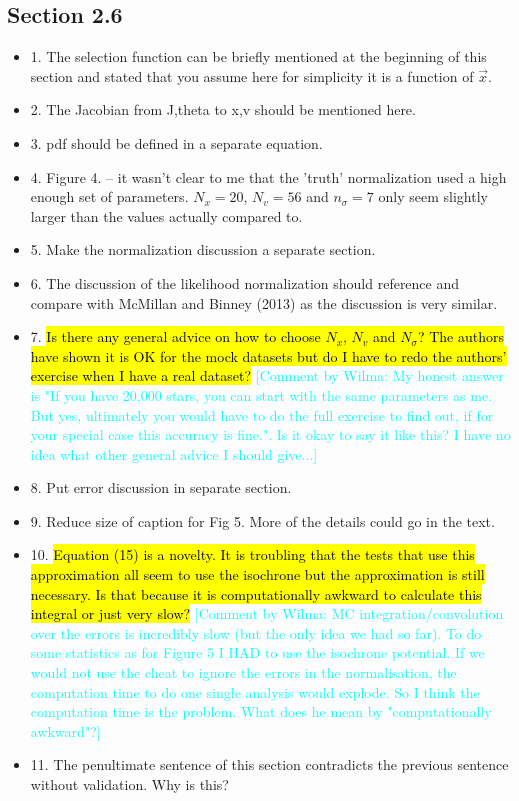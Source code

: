 \documentclass[10pt,a4paper]{article}
\newcommand{\HW}[1]{\textcolor{Cyan}{#1}}
\newcommand{\Jo}[1]{\textcolor{YellowOrange}{#1}}
\begin{document}
\subsection{Section 2.6}
\begin{itemize}
\item 1. The selection function can be briefly mentioned at the beginning of this section and stated that you assume here for simplicity it is a function of $\vec{x}$.
\item 2. \Jo{The Jacobian from J,theta to x,v should be mentioned here.}
\item 3. pdf should be defined in a separate equation.
\item 4. Figure 4. -- it wasn't clear to me that the 'truth' normalization used a high enough set of parameters. $N_x=20$, $N_v=56$ and $n_\sigma=7$ only seem slightly larger than the values actually compared to.
\item 5. Make the normalization discussion a separate section.
\item 6. The discussion of the likelihood normalization should reference and compare with McMillan and Binney (2013) as the discussion is very similar.
\item 7. \hl{Is there any general advice on how to choose $N_x$, $N_v$ and $N_\sigma$? The authors have shown it is OK for the mock datasets but do I have to redo the authors' exercise when I have a real dataset?} \HW{[Comment by Wilma: My honest answer is "If you have 20,000 stars, you can start with the same parameters as me. But yes, ultimately you would have to do the full exercise to find out, if for your special case this accuracy is fine.". Is it okay to say it like this? I have no idea what other general advice I should give...]}
\item 8. Put error discussion in separate section.
\item 9. Reduce size of caption for Fig 5. More of the details could go in the text.
\item 10. \hl{Equation (15) is a novelty. It is troubling that the tests that use this approximation all seem to use the isochrone but the approximation is still necessary. Is that because it is computationally awkward to calculate this integral or just very slow?} \HW{[Comment by Wilma: MC integration/convolution over the errors is incredibly slow (but the only idea we had so far). To do some statistics as for Figure 5 I HAD to use the isochrone potential. If we would not use the cheat to ignore the errors in the normalisation, the computation time to do one single analysis would explode. So I think the computation time is the problem. What does he mean by "computationally awkward"?]}
\item 11. The penultimate sentence of this section contradicts the previous sentence without validation. Why is this?
\end{itemize}
\end{document}
